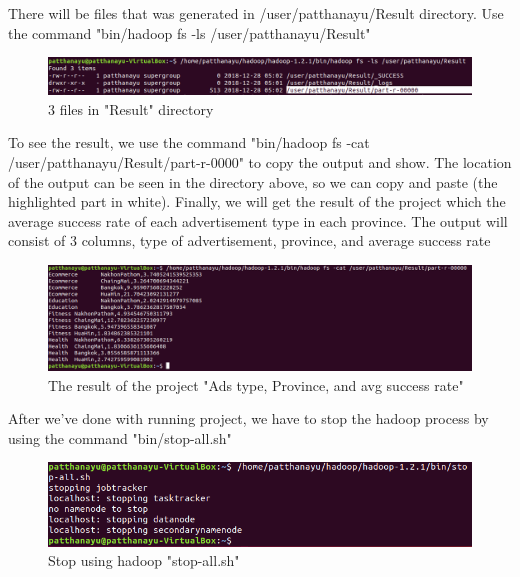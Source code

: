 \documentclass[11pt]{article}
\begin{document}
There will be files that was generated in /user/patthanayu/Result directory. Use the command "bin/hadoop fs -ls /user/patthanayu/Result"

\begin{figure}[h]
\centering
\includegraphics[scale=0.65]{in2}
\caption{3 files in "Result" directory}
\end{figure}


\newpage
To see the result, we use the command "bin/hadoop fs -cat /user/patthanayu/Result/part-r-0000" to copy the output and show. The location of the output can be seen in the directory above, so we can copy and paste (the highlighted part in white). Finally, we will get the result of the project which the average success rate of each advertisement type in each province. The output will consist of 3 columns, type of advertisement, province, and average success rate

\begin{figure}[h]
\centering
\includegraphics[scale=0.58]{in3}
\caption{The result of the project "Ads type,   Province, and avg success rate"}
\end{figure}

After we've done with running project, we have to stop the hadoop process by using the command "bin/stop-all.sh"

\begin{figure}[h]
\centering
\includegraphics[scale=0.7]{in6}
\caption{Stop using hadoop "stop-all.sh"}
\end{figure}
\end{document}
